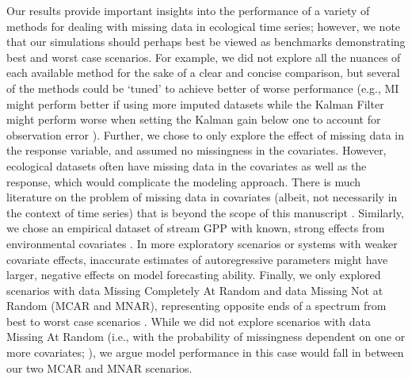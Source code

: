 \documentclass{article}
\begin{document}
Our results provide important insights into the performance of a variety of methods for dealing with missing data in ecological time series; however, we note that our simulations should perhaps best be viewed as benchmarks demonstrating best and worst case scenarios. For example, we did not explore all the nuances of each available method for the sake of a clear and concise comparison, but several of the methods could be `tuned' to achieve better of worse performance (e.g., MI might perform better if using more imputed datasets \citep{honaker_what_2010} while the Kalman Filter might perform worse when setting the Kalman gain below one to account for observation error \citep{kalman_filter_1960}). Further, we chose to only explore the effect of missing data in the response variable, and assumed no missingness in the covariates. However, ecological datasets often have missing data in the covariates as well as the response, which would complicate the modeling approach. There is much literature on the problem of missing data in covariates (albeit, not necessarily in the context of time series) that is beyond the scope of this manuscript \citep{Little_1992}.
Similarly, we chose an empirical dataset of stream GPP with known, strong effects from environmental covariates \citep{hall_turbidity_2015,bernhardt_metabolic_2018}. %
In more exploratory scenarios or systems with weaker covariate effects, inaccurate estimates of autoregressive parameters might have larger, negative effects on model forecasting ability. Finally, we only explored scenarios with data Missing Completely At Random and data Missing Not at Random (MCAR and MNAR), representing opposite ends of a spectrum from best to worst case scenarios \citep{newman_missing_2014}. While we did not explore scenarios with data Missing At Random (i.e., with the probability of missingness dependent on one or more covariates; \citep{newman_missing_2014}), we argue model performance in this case would fall in between our two MCAR and MNAR scenarios. %
\end{document}
